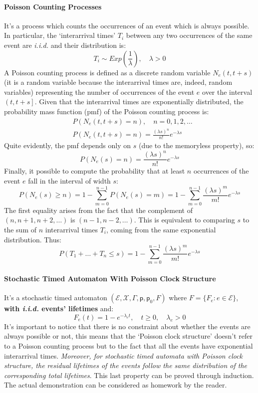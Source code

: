 \documentclass[12pt,a4paper]{article}
\newcommand*{\transp}{\mathsf{p}}
\begin{document}
\paragraph{Poisson Counting Processes} It's a process which counts the occurrences of an event which is always possible. In particular, the `interarrival times' $T_i$ between any two occurrences of the same event are \textit{i.i.d.} and their distribution is:
$$
T_i\sim Exp\left(\frac{1}{\lambda}\right), \quad \lambda > 0
$$
\noindent
A Poisson counting process is defined as a discrete random variable $N_e(t,t+s)$ (it is a random variable because the interarrival times are, indeed, random variables) representing the number of occurrences of the event $e$ over the interval $\left( t,t+s\right]$. Given that the interarrival times are exponentially distributed, the probability mass function (pmf) of the Poisson counting process is:
\begin{equation*}
\begin{aligned}
&P\left(N_e(t,t+s)=n\right), \quad n = 0,1,2,\dots \\
&P\left(N_e(t,t+s)=n\right) = \frac{(\lambda s)^n}{n!}e^{-\lambda s}
\end{aligned}
\end{equation*}
Quite evidently, the pmf depends only on $s$ (due to the memoryless property), so:
\begin{equation}
\label{eq:poissonCountingDef}
P\left(N_e(s)=n\right) = \frac{(\lambda s)^n}{n!}e^{-\lambda s}
\end{equation}
Finally, it possible to compute the probability that at least $n$ occurrences of the event $e$ fall in the interval of width $s$:
$$
P\left(N_e(s) \geq n\right) = 1 - \sum_{m=0}^{n-1}P\left(N_e(s) = m \right) = 1 - \sum_{m=0}^{n-1} \frac{(\lambda s)^m}{m!}e^{-\lambda s}
$$
The first equality arises from the fact that the complement of $(n,n+1,n+2,\dots)$ is $(n-1,n-2,\dots)$. This is equivalent to comparing $s$ to the sum of $n$ interarrival times $T_i$, coming from the same exponential distribution. Thus:
$$
P(T_1 + \dots + T_n \leq s) = 1 - \sum_{m=0}^{n-1} \frac{(\lambda s)^m}{m!}e^{-\lambda s}
$$
\newpage
\paragraph{Stochastic Timed Automaton With Poisson Clock Structure}
It's a stochastic timed automaton 
$(\mathcal{E},\mathcal{X},\Gamma,\transp,\transp_0,F)$ where $F = \{F_e : e \in \mathcal{E}\}$, \textbf{with \textit{i.i.d.} events' lifetimes} and:
$$
F_e(t)=1-e^{-\lambda_e t}, \quad t\geq 0, \quad \lambda_e>0
$$
It's important to notice that there is no constraint about whether the events are always possible or not, this means that the `Poisson clock structure' doesn't refer to a Poisson counting process but to the fact that all the events have exponential interarrival times.
\emph{Moreover, for stochastic timed automata with Poisson clock structure, the residual lifetimes of the events follow the same distribution of the corresponding total lifetimes}. This last property can be proved through induction. The actual demonstration can be considered as homework by the reader.
\end{document}
